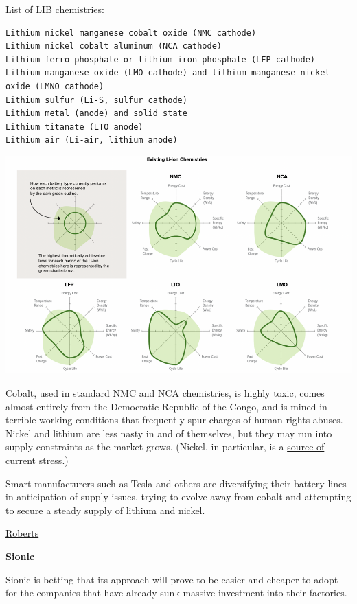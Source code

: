 \documentclass[
]{book}
\begin{document}
List of LIB chemistries:

\begin{verbatim}
Lithium nickel manganese cobalt oxide (NMC cathode)
Lithium nickel cobalt aluminum (NCA cathode)
Lithium ferro phosphate or lithium iron phosphate (LFP cathode)
Lithium manganese oxide (LMO cathode) and lithium manganese nickel oxide (LMNO cathode)
Lithium sulfur (Li-S, sulfur cathode)
Lithium metal (anode) and solid state
Lithium titanate (LTO anode)
Lithium air (Li-air, lithium anode)
\end{verbatim}

\includegraphics{fig/LithiumIon_chemistries.png}

Cobalt, used in standard NMC and NCA chemistries, is highly toxic, comes almost entirely from the Democratic Republic of the Congo, and is mined in terrible working conditions that frequently spur charges of human rights abuses. Nickel and lithium are less nasty in and of themselves, but they may run into supply constraints as the market grows. (Nickel, in particular, is a \href{https://www.bbc.com/news/business-56288781}{source of current stress}.)

Smart manufacturers such as Tesla and others are diversifying their battery lines in anticipation of supply issues, trying to evolve away from cobalt and attempting to secure a steady supply of lithium and nickel.

\href{https://www.canarymedia.com/articles/the-basics-of-how-lithium-ion-batteries-work/}{Roberts}

\textbf{Sionic}

Sionic is betting that its approach will prove to be easier and cheaper to adopt for the companies that have already sunk massive investment into their factories.
\end{document}
